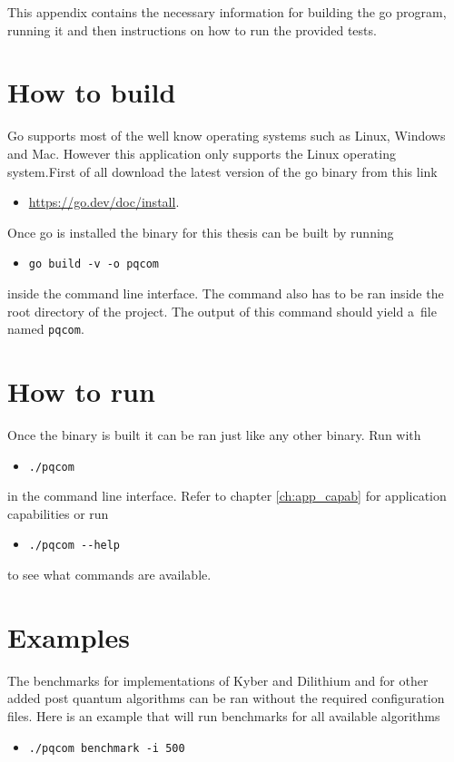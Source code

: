 This appendix contains the necessary information for building the go program, running it and then instructions on how to run the provided tests.

\section{How to build}
Go supports most of the well know operating systems such as Linux, Windows and Mac. However this application only supports the Linux operating system.First of all download the latest version of the go binary from this link
\begin{itemize}
  \item \url{https://go.dev/doc/install}.
\end{itemize}
Once go is installed the binary for this thesis can be built by running
\begin{itemize}
  \item \texttt{go build -v -o pqcom}
\end{itemize}
inside the command line interface. The command also has to be ran inside the root directory of the project. The output of this command should yield a~file named \texttt{pqcom}.
\section{How to run}
Once the binary is built it can be ran just like any other binary. Run with
\begin{itemize}
  \item \texttt{./pqcom}
\end{itemize}
in the command line interface. Refer to chapter \ref{ch:app_capab} for application capabilities or run
\begin{itemize}
  \item \texttt{./pqcom -\--help}
\end{itemize}
to see what commands are available.

\section{Examples}
The benchmarks for implementations of Kyber and Dilithium and for other added post quantum algorithms can be ran without the required configuration files. Here is an example that will run benchmarks for all available algorithms
\begin{itemize}
  \item \texttt{./pqcom benchmark -i 500}
\end{itemize}

